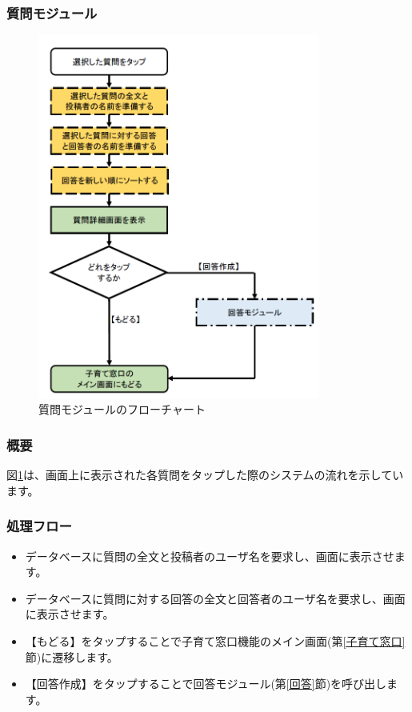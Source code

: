 \documentclass[a4j]{jarticle}
\begin{document}
\subsubsection{質問モジュール\label{質問}} %
\begin{figure}[H]
    \begin{center}
      \includegraphics[height = 12.0cm] {子育て窓口_質問.png} %
    \caption {質問モジュールのフローチャート}
    \label{子育て窓口_質問}
    \end{center}
\end{figure}
\subsubsection*{概要}
図\ref{子育て窓口_質問}は、画面上に表示された各質問をタップした際のシステムの流れを示しています。
\subsubsection*{処理フロー}
\begin{itemize}
\item データベースに質問の全文と投稿者のユーザ名を要求し、画面に表示させます。
\item データベースに質問に対する回答の全文と回答者のユーザ名を要求し、画面に表示させます。
\item 【もどる】をタップすることで子育て窓口機能のメイン画面(第\ref{子育て窓口}節)に遷移します。
\item 【回答作成】をタップすることで回答モジュール(第\ref{回答}節)を呼び出します。

\end{itemize}
\end{document}
